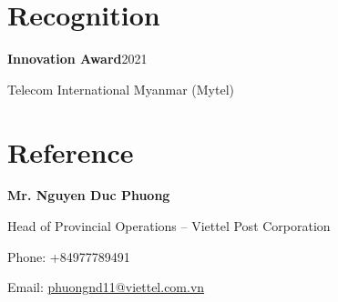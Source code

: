 \documentclass[11pt,a4paper]{article}
\begin{document}
\section{Recognition}
\textbf{Innovation Award}\hfill 2021\par
Telecom International Myanmar (Mytel)

\section{Reference}
\textbf{Mr. Nguyen Duc Phuong}\par
Head of Provincial Operations -- Viettel Post Corporation\par
Phone: +84977789491\par
Email: \href{mailto:phuongnd11@viettel.com.vn}{phuongnd11@viettel.com.vn}
\end{document}
